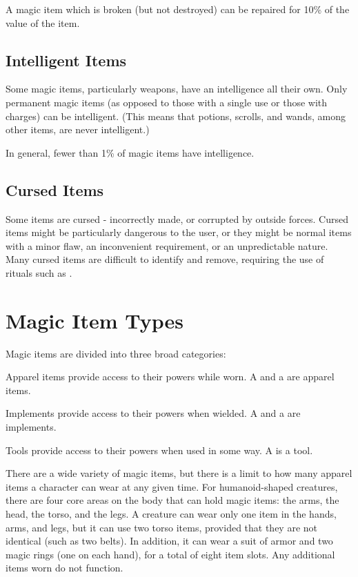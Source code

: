 A magic item which is broken (but not destroyed) can be repaired for 10\% of the value of the item. 

\subsection{Intelligent Items}

Some magic items, particularly weapons, have an intelligence all their own. Only permanent magic items (as opposed to those with a single use or those with charges) can be intelligent. (This means that potions, scrolls, and wands, among other items, are never intelligent.)

In general, fewer than 1\% of magic items have intelligence.

\subsection{Cursed Items}

Some items are cursed - incorrectly made, or corrupted by outside forces. Cursed items might be particularly dangerous to the user, or they might be normal items with a minor flaw, an inconvenient requirement, or an unpredictable nature. Many cursed items are difficult to identify and remove, requiring the use of rituals such as .

\section{Magic Item Types}
Magic items are divided into three broad categories:
\begin{itemize*}
  \item Apparel items provide access to their powers while worn. A  and a  are apparel items.
  \item Implements provide access to their powers when wielded. A  and a  are implements.
  \item Tools provide access to their powers when used in some way. A  is a tool.
\end{itemize*}

 There are a wide variety of magic items, but there is a limit to how many apparel items a character can wear at any given time. For humanoid-shaped creatures, there are four core areas on the body that can hold magic items: the arms, the head, the torso, and the legs. A creature can wear only one item in the hands, arms, and legs, but it can use two torso items, provided that they are not identical (such as two belts). In addition, it can wear a suit of armor and two magic rings (one on each hand), for a total of eight item slots. Any additional items worn do not function.

